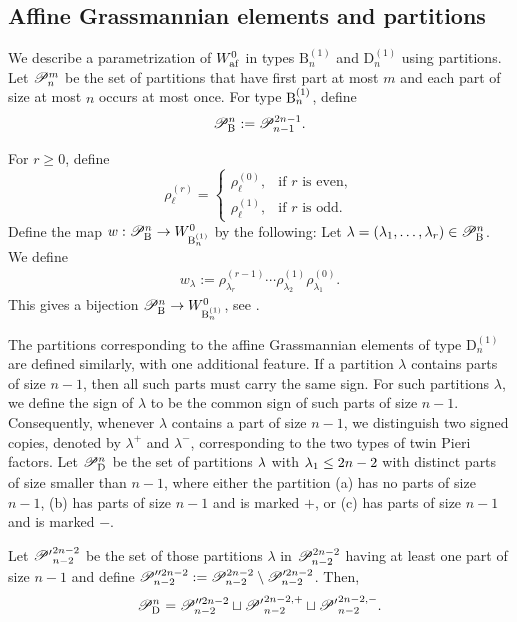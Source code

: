 \documentclass[a4paper]{amsart}
\theoremstyle{remark}
\numberwithin{equation}{section}
\begin{document}
\subsection{Affine Grassmannian elements and partitions}
\label{SS:Grass and partitions}
We describe a parametrization of 
$W_{\mathrm{af}}^0$ in types $\mathrm{B}_n^{(1)}$ and $\mathrm{D}_n^{(1)}$ using partitions. 
Let $\mathscr{P}^m_n$ be the set of partitions that have first part at most $m$ and each part of size at most $n$ occurs at most once.
For type $\mathrm{B}_{n}^{(1)}$, define 
$$\mathscr{P}^n_{\mathrm{B}_{}}:=\mathscr{P}_{n-1}^{2n-1}.$$



For \(r\geq 0\), define
\begin{equation}\label{eq_rho_i_l}
  \rho_\ell^{(r)}= \begin{cases} \rho_\ell^{(0)}, & \text{if \(r\) is even},\\ \rho_\ell^{(1)}, & \text{if \(r\) is odd}. \end{cases}  
\end{equation}
Define the map $w: \mathscr{P}^n_{\mathrm{B}_{}}\to W_{\mathrm{B}_{n}^{(1)}}^0$ by the following: Let $\lambda=(\lambda_1,\dots,\lambda_r)\in \mathscr{P}^n_{\mathrm{B}_{}}$. We define
\begin{align}\label{eq_w_lam}
w_\lambda:=\rho_{\lambda_r}^{(r-1)}\cdots\rho_{\lambda_2}^{(1)}\rho_{\lambda_1}^{(0)}.
\end{align}
This gives a bijection $\mathscr{P}^n_{\mathrm{B}_{}}\to W_{\mathrm{B}_{n}^{(1)}}^0$, see \cite[Theorem 28]{BM}.%


The partitions corresponding to the affine Grassmannian elements of type \(\mathrm{D}_n^{(1)}\) are defined similarly, with one additional feature. If a partition \(\lambda\) contains parts of size $n-1$, then all such parts must carry the same sign. For such partitions $\lambda$, we define the sign of \(\lambda\) to be the common sign of such parts of size $n-1$. Consequently, whenever \(\lambda\) contains a part of size $n-1$, we distinguish two signed copies, denoted by \(\lambda^{+}\) and \(\lambda^{-}\), corresponding to the two types of twin Pieri factors. Let $\mathscr{P}^n_{\mathrm{D}_{}}$ be the set of partitions $\lambda$ with $\lambda_1 \le 2n-2$ 
with distinct parts of size smaller than $n-1$, where either the partition (a) has no parts of size $n-1$, (b) has parts of size $n-1$ and is marked $+$, or (c) has parts of size $n-1$ and is marked $-$. 


Let ${\mathscr{P}'}^{2n-2}_{n-2}$ be the set of those partitions $\lambda$ in $ \mathscr{P}^{2n-2}_{n-2}$ having at least one part of size $n-1$ and define ${\mathscr{P}}''^{2n-2}_{n-2}:={\mathscr{P}}^{2n-2}_{n-2}\setminus {\mathscr{P}}'^{2n-2}_{n-2}$. Then, 
\begin{align}
    \mathscr{P}^n_{\mathrm{D}_{}}={\mathscr{P}}''^{2n-2}_{n-2}\sqcup{\mathscr{P}'}^{2n-2,+}_{n-2}\sqcup{\mathscr{P}'}^{2n-2,-}_{n-2}.
\end{align}
\end{document}
